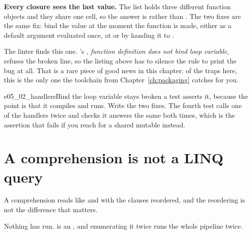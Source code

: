 
\begin{trapbox}
\textbf{Every closure sees the last value.} The list holds three different
function objects and they share one cell, so the answer is
\code{[2, 2, 2]} rather than \code{[0, 1, 2]}. The two fixes are the same
fix: bind the value at the moment the function is made, either as a default
argument \dash{} evaluated once, at  \dash{} or by handing it to
.
\end{trapbox}


\noindent
The linter finds this one. 's , \emph{function
definition does not bind loop variable}, refuses the broken line, so the
listing above has to silence the rule to print the bug at all. That is a
rare piece of good news in this chapter: of the traps here, this is the
only one the toolchain from Chapter~\ref{ch:packaging} catches for you.

\begin{exercise}{e05_02_handlers}{Bind the loop variable}
 stays broken \dash{} a test asserts it, because the point is
that it compiles and runs. Write the two fixes. The fourth test calls one
of the handlers twice and checks it answers the same both times, which is
the assertion that fails if you reach for a shared mutable instead.
\end{exercise}

\section{A comprehension is not a LINQ query}
\label{sec:ch05-comprehensions}

A comprehension reads like  and  with the clauses
reordered, and the reordering is not the difference that matters.

\begin{csbox}
Nothing has run.  is an , and
enumerating it twice runs the whole pipeline twice.
\end{csbox}

